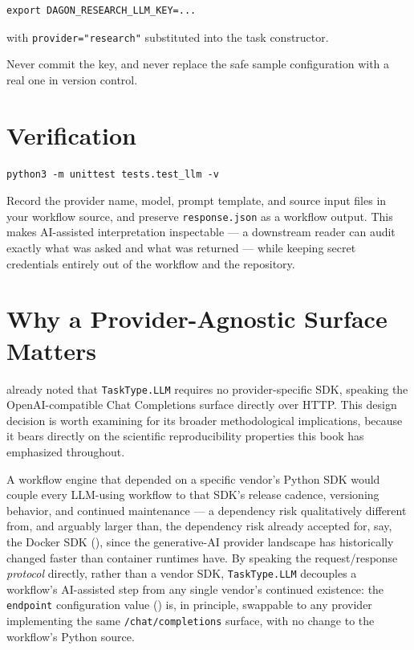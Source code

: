\begin{lstlisting}[style=bash]
export DAGON_RESEARCH_LLM_KEY=...
\end{lstlisting}

with \texttt{provider="research"} substituted into the task constructor.
\begin{cautionbox}
Never commit the key, and never replace the safe sample configuration with a
real one in version control.
\end{cautionbox}

\section{Verification}

\begin{lstlisting}[style=bash]
python3 -m unittest tests.test_llm -v
\end{lstlisting}

\begin{practicebox}
Record the provider name, model, prompt template, and source input files in
your workflow source, and preserve \texttt{response.json} as a workflow
output. This makes AI-assisted interpretation inspectable --- a downstream
reader can audit exactly what was asked and what was returned --- while
keeping secret credentials entirely out of the workflow and the repository.
\end{practicebox}

\section{Why a Provider-Agnostic Surface Matters}

 already noted that \texttt{TaskType.LLM} requires no
provider-specific SDK, speaking the OpenAI-compatible Chat Completions
surface directly over HTTP. This design decision is worth examining for its
broader methodological implications, because it bears directly on the
scientific reproducibility properties this book has emphasized throughout.

A workflow engine that depended on a specific vendor's Python SDK would
couple every LLM-using workflow to that SDK's release cadence, versioning
behavior, and continued maintenance --- a dependency risk qualitatively
different from, and arguably larger than, the dependency risk already
accepted for, say, the Docker SDK (), since the
generative-AI provider landscape has historically changed faster than
container runtimes have. By speaking the request/response \emph{protocol}
directly, rather than a vendor SDK, \texttt{TaskType.LLM} decouples a
workflow's AI-assisted step from any single vendor's continued existence:
the \texttt{endpoint} configuration value () is, in
principle, swappable to any provider implementing the same
\texttt{/chat/completions} surface, with no change to the workflow's Python
source.

